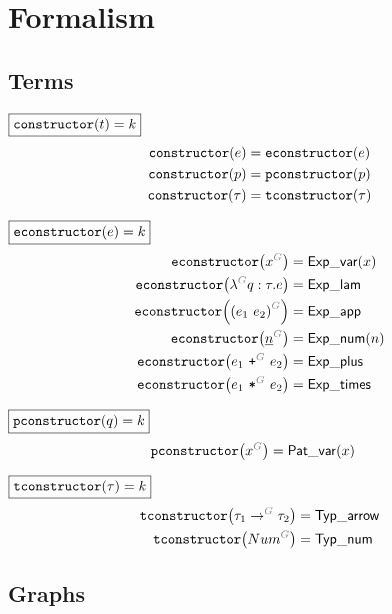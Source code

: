 \section{Formalism}


\subsection{Terms}

\figureTermSyntaxContent

\noindent $\boxed{\constructor{t} = k}$
%
\begin{align*}
  \constructor{e} &= \econstructor{e} \\
  \constructor{p} &= \pconstructor{p} \\
  \constructor{\tau} &= \tconstructor{\tau}
\end{align*}

\noindent $\boxed{\econstructor{e} = k}$
%
\begin{align*}
  \econstructor{\eVar{G}{x}} &= \ExpVar(x) \\
  \econstructor{\eFun{G}{q}{\tau}{e}} &= \ExpLam \\
  \econstructor{\eApp{G}{e_1}{e_2}} &= \ExpApp \\
  \econstructor{\eNum{G}{n}} &= \ExpNum(n) \\
  \econstructor{\ePlus{G}{e_1}{e_2}} &= \ExpPlus \\
  \econstructor{\eTimes{G}{e_1}{e_2}} &= \ExpTimes
\end{align*}

\noindent $\boxed{\pconstructor{q} = k}$
%
\begin{align*}
  \pconstructor{\pVar{G}{x}} &= \PatVar(x)
\end{align*}

\noindent $\boxed{\tconstructor{\tau} = k}$
%
\begin{align*}
  \tconstructor{\tArrow{G}{\tau_1}{\tau_2}} &= \TypArrow \\
  \tconstructor{\tNum{G}} &= \TypNum
\end{align*}


\subsection{Graphs}

